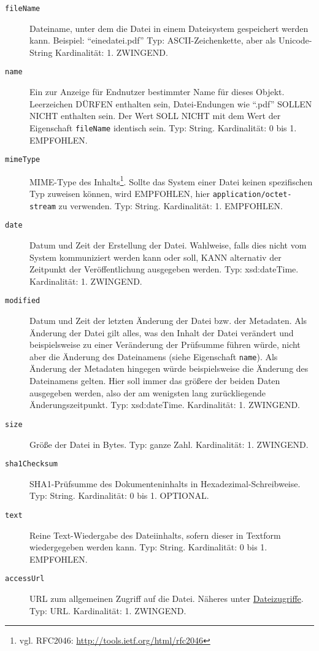 \documentclass[,a4paper]{article}
\begin{document}
\begin{description}
\item[\texttt{fileName}]
Dateiname, unter dem die Datei in einem Dateisystem gespeichert werden
kann. Beispiel: ``einedatei.pdf'' Typ: ASCII-Zeichenkette, aber als
Unicode-String Kardinalität: 1. ZWINGEND.
\item[\texttt{name}]
Ein zur Anzeige für Endnutzer bestimmter Name für dieses Objekt.
Leerzeichen DÜRFEN enthalten sein, Datei-Endungen wie ``.pdf'' SOLLEN
NICHT enthalten sein. Der Wert SOLL NICHT mit dem Wert der Eigenschaft
\texttt{fileName} identisch sein. Typ: String. Kardinalität: 0 bis 1.
EMPFOHLEN.
\item[\texttt{mimeType}]
MIME-Type des Inhalts\footnote{vgl. RFC2046:
  \url{http://tools.ietf.org/html/rfc2046}}. Sollte das System einer
Datei keinen spezifischen Typ zuweisen können, wird EMPFOHLEN, hier
\texttt{application/octet-stream} zu verwenden. Typ: String.
Kardinalität: 1. EMPFOHLEN.
\item[\texttt{date}]
Datum und Zeit der Erstellung der Datei. Wahlweise, falls dies nicht vom
System kommuniziert werden kann oder soll, KANN alternativ der Zeitpunkt
der Veröffentlichung ausgegeben werden. Typ: xsd:dateTime. Kardinalität:
1. ZWINGEND.
\item[\texttt{modified}]
Datum und Zeit der letzten Änderung der Datei bzw. der Metadaten. Als
Änderung der Datei gilt alles, was den Inhalt der Datei verändert und
beispielsweise zu einer Veränderung der Prüfsumme führen würde, nicht
aber die Änderung des Dateinamens (siehe Eigenschaft \texttt{name}). Als
Änderung der Metadaten hingegen würde beispielsweise die Änderung des
Dateinamens gelten. Hier soll immer das größere der beiden Daten
ausgegeben werden, also der am wenigsten lang zurückliegende
Änderungszeitpunkt. Typ: xsd:dateTime. Kardinalität: 1. ZWINGEND.
\item[\texttt{size}]
Größe der Datei in Bytes. Typ: ganze Zahl. Kardinalität: 1. ZWINGEND.
\item[\texttt{sha1Checksum}]
SHA1-Prüfsumme des Dokumenteninhalts in Hexadezimal-Schreibweise. Typ:
String. Kardinalität: 0 bis 1. OPTIONAL.
\item[\texttt{text}]
Reine Text-Wiedergabe des Dateiinhalts, sofern dieser in Textform
wiedergegeben werden kann. Typ: String. Kardinalität: 0 bis 1.
EMPFOHLEN.
\item[\texttt{accessUrl}]
URL zum allgemeinen Zugriff auf die Datei. Näheres unter
\hyperref[dateizugriff]{Dateizugriffe}. Typ: URL. Kardinalität: 1.
ZWINGEND.

\end{description}
\end{document}
